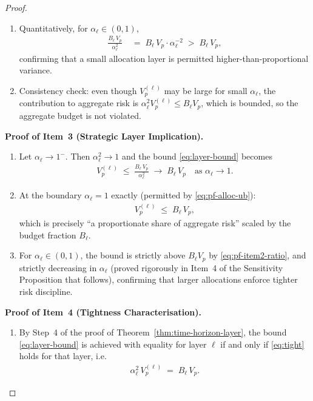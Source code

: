 \documentclass[12pt,openany]{book}
\numberwithin{equation}{chapter}
\theoremstyle{plain}
\theoremstyle{definition}
\theoremstyle{remark}
\begin{document}
\begin{proof}
\begin{enumerate}
  \item Quantitatively, for $\alpha_\ell \in (0,1)$,
        \begin{align}
          \frac{B_\ell\,V_p}{\alpha_\ell^2}
          &\;=\;
          B_\ell\,V_p \cdot \alpha_\ell^{-2}
          \;>\;
          B_\ell\,V_p,
          \label{eq:pf-item2-quant}
        \end{align}
        confirming that a small allocation layer is permitted
        higher-than-proportional variance.

  \item Consistency check: even though $V_p^{(\ell)}$ may be
        large for small $\alpha_\ell$, the contribution to
        aggregate risk is $\alpha_\ell^2 V_p^{(\ell)} \leq
        B_\ell V_p$, which is bounded, so the aggregate budget
        is not violated.
\end{enumerate}

\medskip
\noindent\textbf{Proof of Item~3 (Strategic Layer Implication).}
\begin{enumerate}
  \item Let $\alpha_\ell \to 1^-$.  Then $\alpha_\ell^2 \to 1$
        and the bound \eqref{eq:layer-bound} becomes
        \begin{align}
          V_p^{(\ell)}
          \;\leq\;
          \frac{B_\ell\,V_p}{\alpha_\ell^2}
          \;\to\;
          B_\ell\,V_p
          \quad\text{as } \alpha_\ell \to 1.
          \label{eq:pf-item3-limit}
        \end{align}

  \item At the boundary $\alpha_\ell = 1$ exactly
        (permitted by \eqref{eq:pf-alloc-ub}):
        \begin{align}
          V_p^{(\ell)}
          \;\leq\;
          B_\ell\,V_p,
          \label{eq:pf-item3-boundary}
        \end{align}
        which is precisely ``a proportionate share of aggregate
        risk'' scaled by the budget fraction $B_\ell$.

  \item For $\alpha_\ell \in (0,1)$, the bound is strictly
        above $B_\ell V_p$ by \eqref{eq:pf-item2-ratio},
        and strictly decreasing in $\alpha_\ell$ (proved
        rigorously in Item~4 of the Sensitivity Proposition
        that follows), confirming that larger allocations
        enforce tighter risk discipline.
\end{enumerate}

\medskip
\noindent\textbf{Proof of Item~4 (Tightness Characterisation).}
\begin{enumerate}
  \item By Step~4 of the proof of
        Theorem~\ref{thm:time-horizon-layer},
        the bound \eqref{eq:layer-bound} is achieved with
        equality for layer $\ell$ if and only if
        \eqref{eq:tight} holds for that layer, i.e.\
        \begin{align}
          \alpha_\ell^2\,V_p^{(\ell)}
          \;=\;
          B_\ell\,V_p.
          \label{eq:pf-item4-tight}
        \end{align}


\end{enumerate}
\end{proof}
\end{document}
